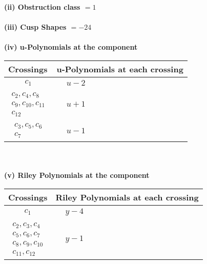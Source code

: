 \documentclass[1p]{elsarticle_modified}
\theoremstyle{definition}
\begin{document}
\flushleft \textbf{(ii) Obstruction class $= 1$}\\~\\
\flushleft \textbf{(iii) Cusp Shapes $= -24$}\\~\\
\newpage\renewcommand{\arraystretch}{1}
\flushleft \textbf{(iv) u-Polynomials at the component}\newline \\
\begin{tabular}{m{50pt}|m{274pt}}
Crossings & \hspace{64pt}u-Polynomials at each crossing \\
\hline $$\begin{aligned}c_{1}\end{aligned}$$&$\begin{aligned}
&u-2
\end{aligned}$\\
\hline $$\begin{aligned}c_{2},c_{4},c_{8}\\c_{9},c_{10},c_{11}\\c_{12}\end{aligned}$$&$\begin{aligned}
&u+1
\end{aligned}$\\
\hline $$\begin{aligned}c_{3},c_{5},c_{6}\\c_{7}\end{aligned}$$&$\begin{aligned}
&u-1
\end{aligned}$\\
\hline
\end{tabular}\\~\\
\newpage\renewcommand{\arraystretch}{1}
\flushleft \textbf{(v) Riley Polynomials at the component}\newline \\
\begin{tabular}{m{50pt}|m{274pt}}
Crossings & \hspace{64pt}Riley Polynomials at each crossing \\
\hline $$\begin{aligned}c_{1}\end{aligned}$$&$\begin{aligned}
&y-4
\end{aligned}$\\
\hline $$\begin{aligned}c_{2},c_{3},c_{4}\\c_{5},c_{6},c_{7}\\c_{8},c_{9},c_{10}\\c_{11},c_{12}\end{aligned}$$&$\begin{aligned}
&y-1
\end{aligned}$\\
\hline
\end{tabular}\\~\\
\end{document}

